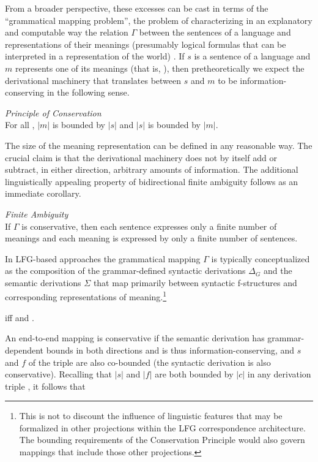 \documentclass[output=paper,hidelinks]{langscibook}
\begin{document}
From a broader perspective, these excesses can be cast in terms of the ``grammatical mapping problem'', the problem of characterizing in an explanatory and computable way the relation $\Gamma$ between the sentences of a language and representations of their meanings (presumably logical formulas that can be interpreted in a representation of the world) \citep{kaplanbresnan82,kaplan1987three}.  If $s$ is a sentence of a language and $m$ represents one of its meanings (that is, ), then pretheoretically we expect the derivational machinery that translates between $s$ and $m$ to be information-conserving in the following sense.

\ea\label{conservation}
{\em Principle of Conservation}\\
            For all , $|m|$ is bounded by $|s|$ and $|s|$ is bounded by $|m|$.
 \z

\noindent The size of the meaning representation can be defined in any reasonable way.  The crucial claim is that the derivational machinery does not by itself add or subtract, in either direction, arbitrary amounts of information.  The additional linguistically appealing property of bidirectional finite ambiguity follows as an immediate corollary. 

\ea\label{finite}
{\em Finite Ambiguity}  \\
If $\Gamma$ is conservative, then each sentence expresses only a finite number of meanings and each meaning  is expressed by only a finite number of sentences. 
\z

In LFG-based approaches the grammatical mapping $\Gamma$ is typically conceptualized as the composition of the grammar-defined syntactic derivations $\Delta_G$ and the semantic derivations $\Sigma$ that map primarily between syntactic f-structures and corresponding representations of meaning.\footnote{This is not to discount the influence of linguistic features that may be formalized in other projections within the LFG correspondence architecture. The bounding requirements of the Conservation Principle would  also govern mappings that include those other projections.}

\ea\label{gamma}
        iff  and .
\z

\noindent An end-to-end mapping  is conservative if the semantic derivation  has grammar-dependent bounds in both directions and is thus information-conserving, and $s$ and $f$ of the triple  are also co-bounded (the syntactic derivation is also conservative).  Recalling that $|s|$ and $|f|$ are both bounded by $|c|$ in any derivation triple , it follows that
\end{document}
